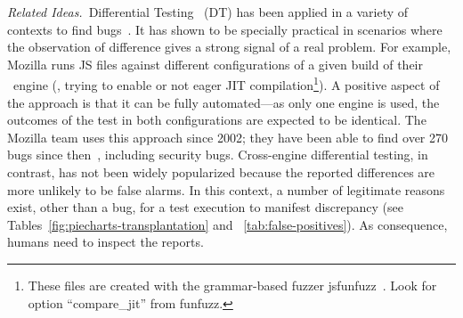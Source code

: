 \documentclass[smallextended]{svjour3}
\begin{document}
%
\emph{Related Ideas.}~Differential Testing~\cite{Brumley-etal-ss07}
(DT) has been applied in a variety of contexts to find
bugs~\cite{Yang-etal-pldi11,Chen-etal-fse2015,Argyros-etla-ccs16,Chen-etal-pldi16,petsios-etal-sp2017,SivakornAPKJ17,Zhang:2017:ATD:3097368.3097448}.
It has shown to be specially practical in scenarios where the
observation of difference gives a strong signal of a real problem. For
example, Mozilla runs JS files against different configurations of a
given build of their \smonkey\ engine (\eg{}, trying to enable or not
eager JIT compilation\footnote{These files are created with the
  grammar-based fuzzer jsfunfuzz~\cite{jsfunfuzz}. Look for option
  ``compare\_jit'' from funfuzz.}). A positive aspect of the approach
is that it can be fully automated---as only one engine is used, the
outcomes of the test in both configurations are expected to be
identical. The Mozilla team uses this approach since 2002; they have
been able to find over 270 bugs since
then~\cite{jsfunfuzz-at-mozilla}, including security
bugs. Cross-engine differential testing, in contrast, has not been
widely popularized because the reported differences are more unlikely
to be false alarms. In this context, a number of legitimate reasons
exist, other than a bug, for a test execution to manifest discrepancy
(see Tables~\ref{fig:piecharts-transplantation} and
~\ref{tab:false-positives}). As consequence, humans need to inspect
the reports.




\end{document}
